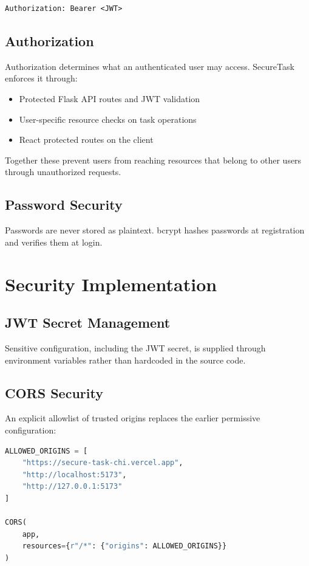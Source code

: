 \documentclass[11pt,a4paper]{article}
\begin{document}
\begin{lstlisting}
Authorization: Bearer <JWT>
\end{lstlisting}

\subsection{Authorization}
Authorization determines what an authenticated user may access. SecureTask enforces it through:

\begin{itemize}[leftmargin=*]
\item Protected Flask API routes and JWT validation
\item User-specific resource checks on task operations
\item React protected routes on the client
\end{itemize}

Together these prevent users from reaching resources that belong to other users through unauthorized requests.

\subsection{Password Security}
Passwords are never stored as plaintext. bcrypt hashes passwords at registration and verifies them at login.

\section{Security Implementation}

\subsection{JWT Secret Management}
Sensitive configuration, including the JWT secret, is supplied through environment variables rather than hardcoded in the source code.

\subsection{CORS Security}
An explicit allowlist of trusted origins replaces the earlier permissive configuration:

\begin{lstlisting}[language=Python]
ALLOWED_ORIGINS = [
    "https://secure-task-chi.vercel.app",
    "http://localhost:5173",
    "http://127.0.0.1:5173"
]

CORS(
    app,
    resources={r"/*": {"origins": ALLOWED_ORIGINS}}
)
\end{lstlisting}
\end{document}
